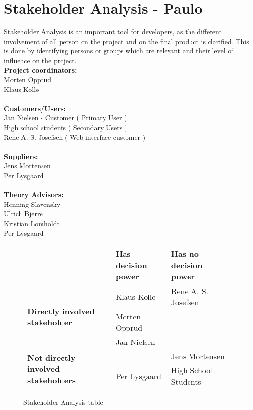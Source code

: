 \section{Stakeholder Analysis - Paulo}

Stakeholder Analysis is an important tool for developers, as the different involvement of all person on the project and on the final product is clarified. This is done by identifying persons or groups which are relevant and their level of influence on the project.
\\[0.2cm]
\textbf{Project coordinators:}\\ Morten Opprud\\ Klaus Kolle\\
\\
\textbf{Customers/Users:}\\
Jan Nielsen - Customer ( Primary User )\\
High school students ( Secondary Users )\\
Rene A. S. Josefsen ( Web interface customer )\\
\\
\textbf{Suppliers:}\\
Jens Mortensen\\
Per Lysgaard\\
\\
\textbf{Theory Advisors:}\\
Henning Slavensky\\
Ulrich Bjerre\\
Kristian Lomholdt\\
Per Lysgaard\\

\begin{figure}[h!]
 \begin{center}
  \begin{tabular}{| l | l | l |}
   \hline
    & \textbf{Has decision power} & \textbf{Has no decision power} \\ \hline
    \multirow{3}{*}{\textbf{Directly involved stakeholder}} 
    	& Klaus Kolle & Rene A. S. Josefsen\\ 
    	& Morten Opprud &  \\ 
    	& Jan Nielsen &  \\ \hline
    \multirow{2}{*}{\textbf{Not directly involved stakeholders}} 
    	&  & Jens Mortensen\\
    	& Per Lysgaard & High School Students \\ \hline
   \end{tabular}
  \end{center}
 \caption{Stakeholder Analysis table}
\end{figure}

